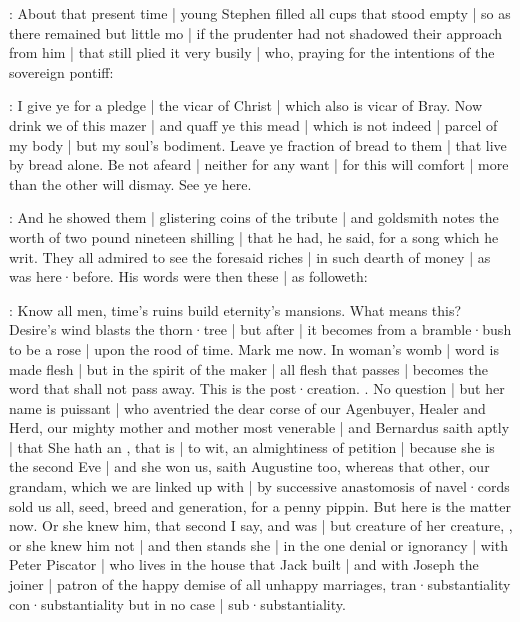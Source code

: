 

:
About that present time |
young Stephen filled all cups that stood empty |
so as there remained but little mo |
if the prudenter had not shadowed their approach from him |
that still plied it very busily |
who, praying for the intentions
of the sovereign pontiff:

\stephen:
I give ye for a pledge |
the vicar of Christ |
which also is vicar of Bray.
Now drink we of this mazer |
and quaff ye this mead |
which is not indeed |
parcel of my body |
but my soul's bodiment.
Leave ye fraction of bread to them |
that live by bread alone.
Be not afeard |
neither for any want |
for this will comfort |
more than the other will dismay.
See ye here.

:
And he showed them |
glistering coins of the tribute |
and goldsmith notes the worth of two pound nineteen shilling |
that he had,
he said,
for a song which he writ.
They all admired to see the foresaid riches |
in such dearth of money |
as was here·before.
His words were then these |
as followeth:

\stephen:
Know all men,
time's ruins build eternity's mansions.
What means this?
Desire's wind blasts the thorn·tree |
but after |
it becomes from a bramble·bush to be a rose |
upon the rood of time.
Mark me now.
In woman's womb |
word is made flesh |
but in the spirit of the maker |
all flesh that passes |
becomes the word that shall not pass away.
This is the post·creation.
.
No question |
but her name is puissant |
who aventried the dear corse of our Agenbuyer,
Healer and Herd,
our mighty mother and mother most venerable |
and Bernardus saith aptly |
that She hath an ,
that is |
to wit,
an almightiness of petition |
because she is the second Eve |
and she won us,
saith Augustine too,
whereas that other,
our grandam,
which we are linked up with |
by successive anastomosis of navel·cords
sold us all,
seed,
breed and generation,
for a penny pippin.
But here is the matter now.
Or she knew him,
that second I say,
and was |
but creature of her creature,
,
or she knew him not |
and then stands she |
in the one denial or ignorancy |
with Peter Piscator |
who lives in the house that Jack built |
and with Joseph the joiner |
patron of the happy demise of all unhappy marriages,
 tran·substantiality  con·substantiality
but in no case |
sub·substantiality.

